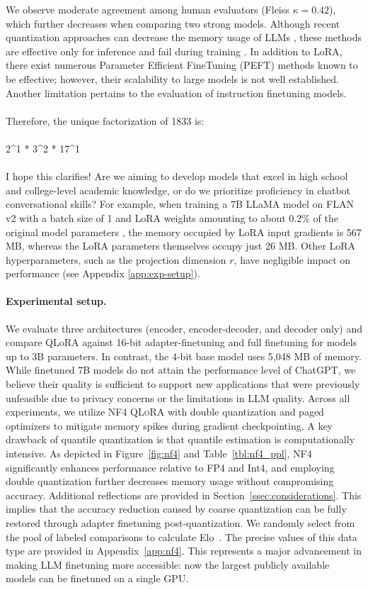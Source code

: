 We observe moderate agreement among human evaluators (Fleiss $\kappa=0.42$), which further decreases when comparing two strong models. Although recent quantization approaches can decrease the memory usage of LLMs \citep{dettmers2022llm, dettmers2022case, frantar2022gptq, xiao2022smoothquant}, these methods are effective only for inference and fail during training \citep{wortsman2023stable}. In addition to LoRA, there exist numerous Parameter Efficient FineTuning (PEFT) methods known to be effective; however, their scalability to large models is not well established. Another limitation pertains to the evaluation of instruction finetuning models. \\ \\ Therefore, the unique factorization of 1833 is: \\ \\ 2\^{}1 * 3\^{}2 * 17\^{}1 \\ \\ I hope this clarifies! Are we aiming to develop models that excel in high school and college-level academic knowledge, or do we prioritize proficiency in chatbot conversational skills? For example, when training a 7B LLaMA model on FLAN v2 with a batch size of 1 and LoRA weights amounting to about 0.2\% of the original model parameters \citep{hu2021lora,liu2022few}, the memory occupied by LoRA input gradients is 567 MB, whereas the LoRA parameters themselves occupy just 26 MB. Other LoRA hyperparameters, such as the projection dimension $r$, have negligible impact on performance (see Appendix \ref{app:exp-setup}). \paragraph{Experimental setup.} We evaluate three architectures (encoder, encoder-decoder, and decoder only) and compare QLoRA against 16-bit adapter-finetuning and full finetuning for models up to 3B parameters. In contrast, the 4-bit base model uses 5,048 MB of memory. While finetuned 7B models do not attain the performance level of ChatGPT, we believe their quality is sufficient to support new applications that were previously unfeasible due to privacy concerns or the limitations in LLM quality. Across all experiments, we utilize NF4 \textsc{QLoRA} with double quantization and paged optimizers to mitigate memory spikes during gradient checkpointing. A key drawback of quantile quantization is that quantile estimation is computationally intensive. As depicted in Figure~\ref{fig:nf4} and Table~\ref{tbl:nf4_ppl}, NF4 significantly enhances performance relative to FP4 and Int4, and employing double quantization further decreases memory usage without compromising accuracy. Additional reflections are provided in Section~\ref{ssec:considerations}. This implies that the accuracy reduction caused by coarse quantization can be fully restored through adapter finetuning post-quantization. We randomly select from the pool of labeled comparisons to calculate Elo~\citep{elo1967proposed,elo1978rating}. The precise values of this data type are provided in Appendix~\ref{app:nf4}. This represents a major advancement in making LLM finetuning more accessible: now the largest publicly available models can be finetuned on a single GPU. 